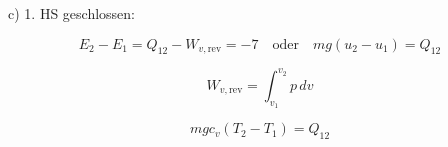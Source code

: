 c) 1. HS geschlossen:

\begin{equation}
E_2 - E_1 = Q_{12} - W_{v, \text{rev}} = -7 \quad \text{oder} \quad mg(u_2 - u_1) = Q_{12}
\end{equation}

\begin{equation}
W_{v, \text{rev}} = \int_{v_1}^{v_2} p \, dv
\end{equation}

\begin{equation}
mgc_v(T_2 - T_1) = Q_{12}
\end{equation}
